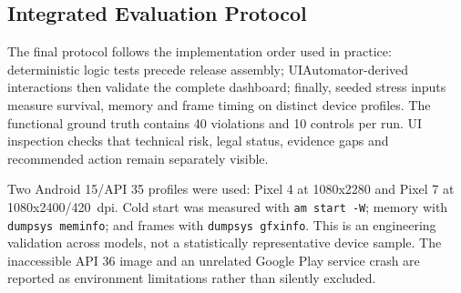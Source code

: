 
\subsection{Integrated Evaluation Protocol}

The final protocol follows the implementation order used in practice: deterministic logic tests precede release assembly; UIAutomator-derived interactions then validate the complete dashboard; finally, seeded stress inputs measure survival, memory and frame timing on distinct device profiles. The functional ground truth contains 40 violations and 10 controls per run. UI inspection checks that technical risk, legal status, evidence gaps and recommended action remain separately visible.

Two Android 15/API 35 profiles were used: Pixel 4 at 1080x2280 and Pixel 7 at 1080x2400/420~dpi. Cold start was measured with \texttt{am start -W}; memory with \texttt{dumpsys meminfo}; and frames with \texttt{dumpsys gfxinfo}. This is an engineering validation across models, not a statistically representative device sample. The inaccessible API 36 image and an unrelated Google Play service crash are reported as environment limitations rather than silently excluded.

